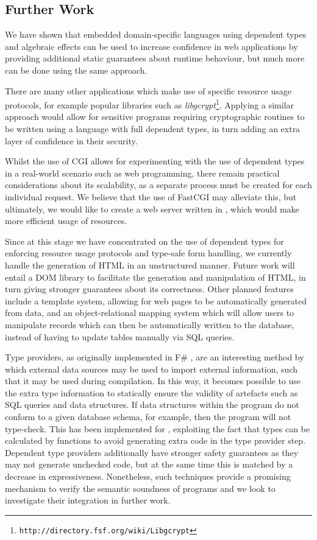 \subsection{Further Work}

We have shown that embedded domain-specific languages using dependent types and
algebraic effects can be used to increase confidence in web applications by
providing additional static guarantees about runtime behaviour, but much more
can be done using the same approach.

There are many other applications which make use of specific resource usage
protocols, for example popular libraries such as
\textit{libgcrypt}\footnote{\texttt{http://directory.fsf.org/wiki/Libgcrypt}}.
Applying a similar approach would allow for sensitive programs requiring
cryptographic routines to be written using a language with full dependent
types, in turn adding an extra layer of confidence in their security. 

Whilst the use of CGI allows for experimenting with the use of dependent types
in a real-world scenario such as web programming, there remain practical
considerations about its scalability, as a separate process must be created for
each individual request. We believe that the use of FastCGI may alleviate this,
but ultimately, we would like to create a web server written in \idris{}, which
would make more efficient usage of resources. 

Since at this stage we have concentrated on the use of dependent types for
enforcing resource usage protocols and type-safe form handling, we currently
handle the generation of HTML in an unstructured manner. Future work will
entail a DOM library to facilitate the generation and manipulation of HTML, in
turn giving stronger guarantees about its correctness. Other planned features
include a template system, allowing for web pages to be automatically generated
from data, and an object-relational mapping system which will allow users to
manipulate records which can then be automatically written to the database,
instead of having to update tables manually via SQL queries.

Type providers, as originally implemented in F\# \cite{msr:tp}, are an
interesting method by which external data sources may be used to import
external information, such that it may be used during compilation. 
In this way, it becomes possible to use the extra type
information to statically ensure the validity of artefacts such as SQL
queries and data structures. If data structures within the program do not
conform to a given database schema, for example, then the program will not
type-check.  This has been implemented for 
\idris{} 
\cite{christiansen:dtp}, exploiting the fact that types can be
calculated by functions to avoid generating extra code in the type provider
step. Dependent type providers additionally have stronger safety guarantees as
they may not generate unchecked code, but at the same time this is matched by a
decrease in expressiveness. Nonetheless, such techniques provide a promising
mechanism to verify the semantic soundness of programs and we look to
investigate their integration in further work.

